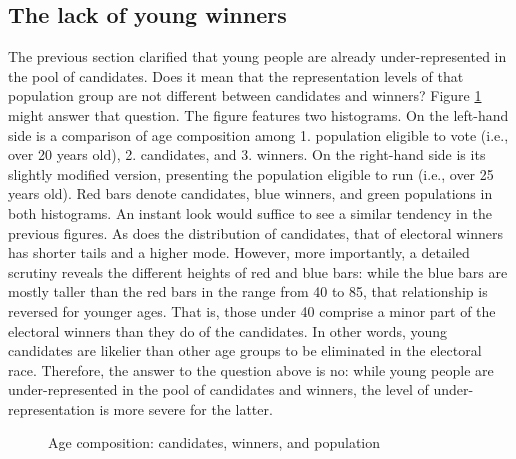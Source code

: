 \documentclass[a4paper, 12pt]{article}\usepackage[dvipdfmx]{graphicx}\usepackage[]{xcolor}
\begin{document}
\subsection{The lack of young winners} \label{ch2.2}

The previous section clarified that young people are already under-represented in the pool of candidates. Does it mean that the representation levels of that population group are not different between candidates and winners? Figure \ref{winners} might answer that question. The figure features two histograms. On the left-hand side is a comparison of age composition among 1. population eligible to vote (i.e., over 20 years old), 2. candidates, and 3. winners. On the right-hand side is its slightly modified version, presenting the population eligible to run (i.e., over 25 years old). Red bars denote candidates, blue winners, and green populations in both histograms. An instant look would suffice to see a similar tendency in the previous figures. As does the distribution of candidates, that of electoral winners has shorter tails and a higher mode. However, more importantly, a detailed scrutiny reveals the different heights of red and blue bars: while the blue bars are mostly taller than the red bars in the range from 40 to 85, that relationship is reversed for younger ages. That is, those under 40 comprise a minor part of the electoral winners than they do of the candidates. In other words, young candidates are likelier than other age groups to be eliminated in the electoral race. Therefore, the answer to the question above is no: while young people are under-represented in the pool of candidates and winners, the level of under-representation is more severe for the latter. 

\begin{figure}[h]
\centering
  \hfill
  \caption{Age composition: candidates, winners, and population}
  \label{winners}
\end{figure}
\end{document}
